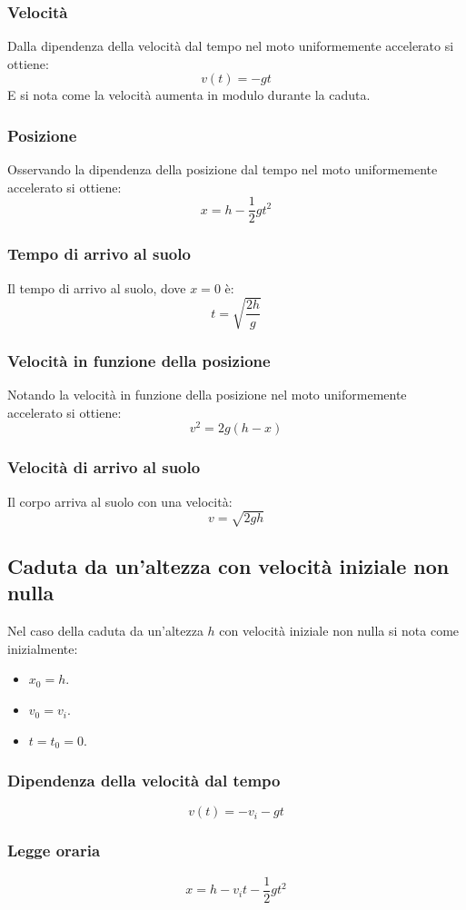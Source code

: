 \documentclass[class=book, crop=false, oneside, 12pt]{standalone}
\begin{document}
		\subsubsection{Velocit\`a}
		Dalla dipendenza della velocit\`a dal tempo nel moto uniformemente accelerato si ottiene:
		$$v(t) = -gt$$
		E si nota come la velocit\`a aumenta in modulo durante la caduta.
		\subsubsection{Posizione}
		Osservando la dipendenza della posizione dal tempo nel moto uniformemente accelerato si ottiene:
		$$x = h -\frac{1}{2}gt^2$$
		\subsubsection{Tempo di arrivo al suolo}
		Il tempo di arrivo al suolo, dove $x=0$ \`e:
		$$t = \sqrt{\dfrac{2h}{g}}$$
		\subsubsection{Velocit\`a in funzione della posizione}
		Notando la velocit\`a in funzione della posizione nel moto uniformemente accelerato si ottiene:
		$$v^2=2g(h-x)$$
		\subsubsection{Velocit\`a di arrivo al suolo}
		Il corpo arriva al suolo con una velocit\`a:
		$$v=\sqrt{2gh}$$
	\subsection{Caduta da un'altezza con velocit\`a iniziale non nulla}
	Nel caso della caduta da un'altezza $h$ con velocit\`a iniziale non nulla si nota come inizialmente:
	\begin{multicols}{3}
		\begin{itemize}
			\item $x_0=h$.
			\item $v_0=v_i$.
			\item $t=t_0=0$.
		\end{itemize}
	\end{multicols}
		\subsubsection{Dipendenza della velocit\`a dal tempo}
		$$v(t) = -v_i -gt$$
		\subsubsection{Legge oraria}
		$$x=h-v_it-\dfrac{1}{2}gt^2$$
\end{document}

